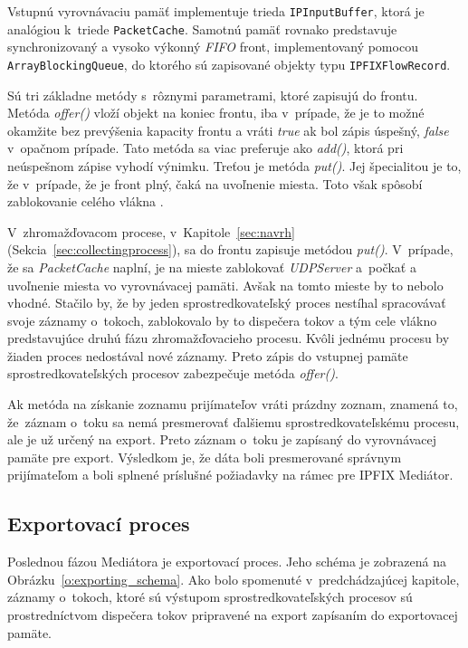 Vstupnú vyrovnávaciu pamäť implementuje trieda \verb|IPInputBuffer|, ktorá je analógiou k~triede \verb|PacketCache|.
Samotnú pamäť rovnako predstavuje synchronizovaný a vysoko výkonný \emph{FIFO} front, implementovaný 
pomocou \verb|ArrayBlockingQueue|, do ktorého sú zapisované objekty typu \verb|IPFIXFlowRecord|.

Sú tri základne metódy s~rôznymi parametrami, ktoré zapisujú do frontu.
Metóda \emph{offer()} vloží objekt na koniec frontu, iba v~prípade, že je to možné 
okamžite bez prevýšenia kapacity frontu a vráti \emph{true} ak bol zápis úspešný, \emph{false}
v~opačnom prípade. Tato metóda sa viac preferuje ako \emph{add()}, ktorá pri neúspešnom zápise 
vyhodí výnimku. Treťou je metóda \emph{put()}. Jej špecialitou je to, že v~prípade, že je front plný,
čaká na uvoľnenie miesta. Toto však spôsobí zablokovanie celého vlákna \citep{arrayblockingqueue}.

V~zhromažďovacom procese, v~Kapitole~\ref{sec:navrh} (Sekcia~\ref{sec:collectingprocess}),
sa do frontu zapisuje metódou \emph{put()}. V~prípade, že sa \emph{PacketCache} naplní, je na mieste 
zablokovať \emph{UDPServer} a~počkať a uvoľnenie miesta vo vyrovnávacej pamäti. Avšak na tomto mieste by 
to nebolo vhodné. Stačilo by, že by jeden sprostredkovateľský proces nestíhal spracovávať svoje záznamy
o~tokoch, zablokovalo by to dispečera tokov a tým cele vlákno predstavujúce druhú fázu zhromažďovacieho
procesu. Kvôli jednému procesu by žiaden proces nedostával nové záznamy. Preto zápis do vstupnej pamäte
sprostredkovateľských procesov zabezpečuje metóda \emph{offer()}.

Ak metóda na získanie zoznamu prijímateľov vráti prázdny zoznam, znamená to, že~záznam o~toku 
sa nemá presmerovať ďalšiemu sprostredkovateľskému procesu, ale je už určený na export. Preto záznam
o~toku je zapísaný do vyrovnávacej pamäte pre export. Výsledkom je, že dáta boli presmerované správnym 
prijímateľom a boli splnené príslušné požiadavky na rámec pre IPFIX Mediátor.

\subsection{Exportovací proces}

Poslednou fázou Mediátora je exportovací proces. Jeho schéma je zobrazená na 
Obrázku~\ref{o:exporting_schema}. Ako bolo spomenuté v~predchádzajúcej kapitole, záznamy 
o~tokoch, ktoré sú výstupom  sprostredkovateľských procesov sú prostredníctvom dispečera 
tokov pripravené na export zapísaním do exportovacej pamäte.

